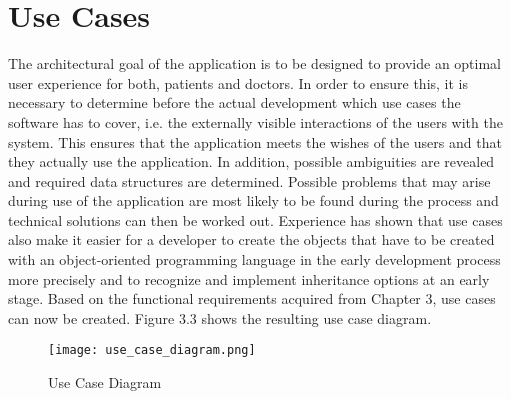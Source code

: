 \section{Use Cases}
The architectural goal of the application is to be designed to provide an optimal user experience for both, patients and doctors. In order to ensure this, it is necessary to determine before the actual development which use cases the software has to cover, i.e. the externally visible interactions of the users with the system. This ensures that the application meets the wishes of the users and that they actually use the application. In addition, possible ambiguities are revealed and required data structures are determined. Possible problems that may arise during use of the application are most likely to be found during the process and technical solutions can then be worked out. Experience has shown that use cases also make it easier for a developer to create the objects that have to be created with an object-oriented programming language in the early development process more precisely and to recognize and implement inheritance options at an early stage. Based on the functional requirements acquired from Chapter 3, use cases can now be created. Figure 3.3 shows the resulting use case diagram. 

\begin{figure}[h]
	\centering
	\texttt{[image: use\_case\_diagram.png]}
	\caption[Use Case Diagram]{Use Case Diagram}
\end{figure}

